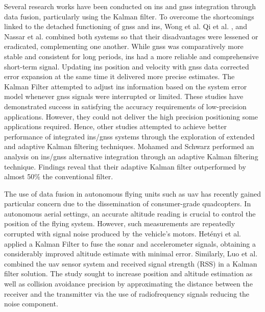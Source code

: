 Several research works have been conducted on \acrfull{ins} and \acrfull{gnss} integration through data fusion, particularly using the Kalman filter. To overcome the shortcomings linked to the detached functioning of \acrshort{gnss} and \acrshort{ins}, Wong et al. \cite{wong1988high} Qi et al. \cite{qi2002direct}, and Nassar et al. \cite{nassar2004improving} combined both systems so that their disadvantages were lessened or eradicated, complementing one another. While \acrshort{gnss} was comparatively more stable and consistent for long periods, \acrshort{ins} had a more reliable and comprehensive short-term signal. Updating \acrshort{ins} position and velocity with \acrshort{gnss} data corrected error expansion at the same time it delivered more precise estimates. The Kalman Filter attempted to adjust \acrshort{ins} information based on the system error model whenever \acrshort{gnss} signals were interrupted or limited. These studies have demonstrated success in satisfying the accuracy requirements of low-precision applications. However, they could not deliver the high precision positioning some applications required. Hence, other studies attempted to achieve better performance of integrated \acrshort{ins}/\acrshort{gnss} systems through the exploration of extended and adaptive Kalman filtering techniques. Mohamed and Schwarz \cite{mohamed1999adaptive} performed an analysis on \acrshort{ins}/\acrshort{gnss} alternative integration through an adaptive Kalman filtering technique. Findings reveal that their adaptive Kalman filter outperformed by almost 50\% the conventional filter.

The use of data fusion in autonomous flying units such as \acrshort{uav} has recently gained particular concern due to the dissemination of consumer-grade quadcopters. In autonomous aerial settings, an accurate altitude reading is crucial to control the position of the flying system. However, such measurements are repeatedly corrupted with signal noise produced by the vehicle's motors. Hetényi et al. \cite{hetenyi2016sensor} applied a Kalman Filter to fuse the sonar and accelerometer signals, obtaining a considerably improved altitude estimate with minimal error. Similarly, Luo et al. \cite{luo2013uav} combined the \acrshort{uav} sensor system and received signal strength (RSS) in a Kalman filter solution. The study sought to increase position and altitude estimation as well as collision avoidance precision by approximating the distance between the receiver and the transmitter via the use of radiofrequency signals reducing the noise component.

